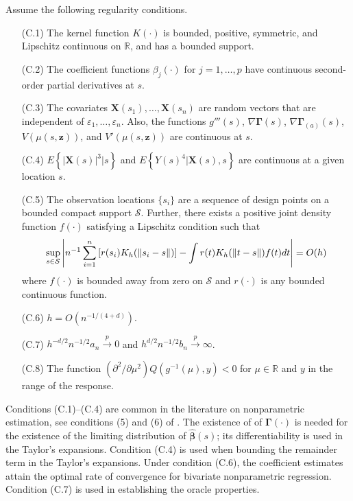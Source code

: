 \documentclass[authoryear,review, 12pt]{elsarticle}
\begin{document}
Assume the following regularity conditions.
\begin{itemize}
\item[(C.1)] The kernel function $K(\cdot)$ is bounded, positive, symmetric,
and Lipschitz continuous on $\mathbb{R}$, and has a bounded support.
\item[(C.2)] The coefficient functions $ $$\beta_{j}(\cdot)$ for $j=1,\dots,p$
have continuous second-order partial derivatives at $s$.
\item[(C.3)] The covariates $\bm{X}(s_{1}),\dots,\bm{X}(s_{n})$ are
random vectors that are independent of $\varepsilon_{1},\dots,\varepsilon_{n}$.
Also, the functions $g'''\left(s\right)$, $\nabla\bm{\Gamma}\left(s\right)$,
$\nabla\bm{\Gamma}_{(a)}\left(s\right)$, $V\left(\mu\left(s,\bm{z}\right)\right)$,
and $V'\left(\mu\left(s,\bm{z}\right)\right)$ are continuous
at $s$.
\item[(C.4)] $E\left\{ \left|\bm{X}(s)\right|^{3}|s\right\} $ and $E\left\{ Y(s)^{4}|\bm{X}(s),s\right\} $
are continuous at a given location $s$.
\item[(C.5)] The observation locations $\{s_{i}\}$ are a sequence of
design points on a bounded compact support $\mathcal{S}$. Further,
there exists a positive joint density function $f(\cdot)$ satisfying
a Lipschitz condition such that 
\[
\sup_{s\text{\ensuremath{\in}}\mathcal{S}}\left|n^{-1}\sum_{i=1}^{n}\left[r(s_{i})K_{h}(\|s_{i}-s\|)\right]-\int r(t)K_{h}(\|t-s\|)f(t)dt\right|=O(h)
\]
where $f(\cdot)$ is bounded away from zero on $\mathcal{S}$ and $r(\cdot)$
is any bounded continuous function.
\item[(C.6)] $h=O\left(n^{-1/(4+d)}\right)$.
\item[(C.7)] $h^{-d/2}n^{-1/2}a_{n}\xrightarrow{p}0$ and $h^{d/2}n^{-1/2}b_{n}\xrightarrow{p}\infty$.
\item[(C.8)] The function $\left(\partial^{2}/\partial\mu^{2}\right)Q\left(g^{-1}\left(\mu\right),y\right)<0$
for $\mu\in\mathbb{R}$ and $y$ in the range of the response.

\end{itemize}
Conditions (C.1)--(C.4) are common in the literature on nonparametric
estimation, see conditions (5) and (6) of \citet{Cai-Fan-Li-2000}.
The existence of of $\bm{\Gamma}(\cdot)$ is needed for the existence
of the limiting distribution of $\hat{\bm{\beta}}(s)$; its differentiability
is used in the Taylor's expansions. Condition (C.4) is used when bounding
the remainder term in the Taylor's expansions.
Under condition (C.6), the coefficient estimates attain the optimal
rate of convergence for bivariate nonparametric regression. Condition
(C.7) is used in establishing the oracle properties.
\end{document}
